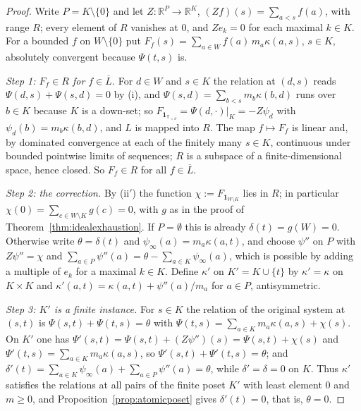 \documentclass[11pt,a4paper]{article}
\theoremstyle{plain}
\theoremstyle{definition}
\theoremstyle{remark}
\newcommand{\R}{\mathbb{R}}
\newcommand{\T}{\mathbb{T}}                     %
\newcommand{\one}{\mathbf{1}}
\begin{document}
\begin{proof}
  Write $P = K \setminus \{0\}$ and let $Z \colon \R^P \to \R^K$,
  $(Zf)(s) = \sum_{a < s} f(a)$, with range $R$; every element of $R$ vanishes
  at $0$, and $Z e_k = 0$ for each maximal $k \in K$.  For a bounded $f$ on
  $W \setminus \{0\}$ put $F_f(s) = \sum_{a \in W} f(a)\, m_a \kappa(a,s)$,
  $s \in K$, absolutely convergent because $\Psi(t,s)$ is.

  \emph{Step 1: $F_f \in R$ for $f \in \overline{L}$.}  For $d \in W$ and
  $s \in K$ the relation at $(d,s)$ reads $\Psi(d,s) + \Psi(s,d) = 0$ by (i),
  and $\Psi(s,d) = \sum_{b < s} m_b \kappa(b,d)$ runs over $b \in K$ because
  $K$ is a down-set; so $F_{\one_{\T_{<d}}} = \Psi(d,\cdot)|_K = -Z\psi_d$ with
  $\psi_d(b) = m_b\kappa(b,d)$, and $L$ is mapped into $R$.  The map
  $f \mapsto F_f$ is linear and, by dominated convergence at each of the
  finitely many $s \in K$, continuous under bounded pointwise limits of
  sequences; $R$ is a subspace of a finite-dimensional space, hence closed.
  So $F_f \in R$ for all $f \in \overline{L}$.

  \emph{Step 2: the correction.}  By (ii$'$) the function
  $\chi := F_{\one_{W \setminus K}}$ lies in $R$; in particular
  $\chi(0) = \sum_{c \in W \setminus K} g(c) = 0$, with $g$ as in the proof of
  Theorem~\ref{thm:idealexhaustion}.  If
  $P = \emptyset$ this is already $\delta(t) = g(W) = 0$.  Otherwise write
  $\theta = \delta(t)$ and $\psi_\infty(a) = m_a\kappa(a,t)$, and choose
  $\psi''$ on $P$ with $Z\psi'' = \chi$ and
  $\sum_{a \in P} \psi''(a) = \theta - \sum_{a \in K} \psi_\infty(a)$, which is
  possible by adding a multiple of $e_k$ for a maximal $k \in K$.  Define
  $\kappa'$ on $K' = K \cup \{t\}$ by $\kappa' = \kappa$ on $K \times K$ and
  $\kappa'(a,t) = \kappa(a,t) + \psi''(a)/m_a$ for $a \in P$, antisymmetric.

  \emph{Step 3: $K'$ is a finite instance.}  For $s \in K$ the relation of the
  original system at $(s,t)$ is $\Psi(s,t) + \Psi(t,s) = \theta$ with
  $\Psi(t,s) = \sum_{a \in K} m_a\kappa(a,s) + \chi(s)$.  On $K'$ one has
  $\Psi'(s,t) = \Psi(s,t) + (Z\psi'')(s) = \Psi(s,t) + \chi(s)$ and
  $\Psi'(t,s) = \sum_{a \in K} m_a\kappa(a,s)$, so
  $\Psi'(s,t) + \Psi'(t,s) = \theta$; and $\delta'(t) = \sum_{a \in K}
  \psi_\infty(a) + \sum_{a \in P} \psi''(a) = \theta$, while
  $\delta' = \delta = 0$ on $K$.  Thus $\kappa'$ satisfies the relations at all
  pairs of the finite poset $K'$ with least element $0$ and $m \geq 0$, and
  Proposition~\ref{prop:atomicposet} gives $\delta'(t) = 0$, that is,
  $\theta = 0$.
\end{proof}
\end{document}
